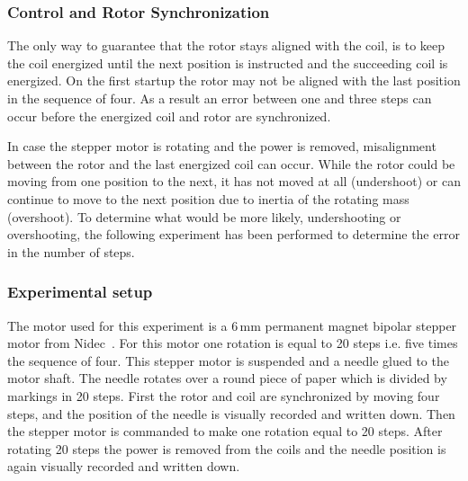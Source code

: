 
\subsubsection{Control and Rotor Synchronization}

The only way to guarantee that the rotor stays aligned with the coil, is to keep the coil energized until the next position is instructed and the succeeding coil is energized. 
On the first startup the rotor may not be aligned with the last position in the sequence of four.
As a result an error between one and three steps can occur before the energized coil and rotor are synchronized.

In case the stepper motor is rotating and the power is removed, misalignment between the rotor and the last energized coil can occur. While the rotor could be moving from one position to the next, it has not moved at all (undershoot) or can continue to move to the next position due to inertia of the rotating mass (overshoot). 
To determine what would be more likely, undershooting or overshooting, the following experiment has been performed to determine the error in the number of steps.

\subsubsection{Experimental setup}

The motor used for this experiment is a 6\,mm permanent magnet bipolar stepper motor from Nidec~\cite{nidec_stepper_2017}.
For this motor one rotation is equal to 20 steps i.e. five times the sequence of four.
This stepper motor is suspended and a needle glued to the motor shaft. The needle rotates over a round piece of paper which is divided by markings in 20 steps. %
First the rotor and coil are synchronized by moving four steps, and the position of the needle is visually recorded and written down. 
Then the stepper motor is commanded to make one rotation equal to 20 steps. 
After rotating 20 steps the power is removed from the coils and the needle position is again visually recorded and written down.


